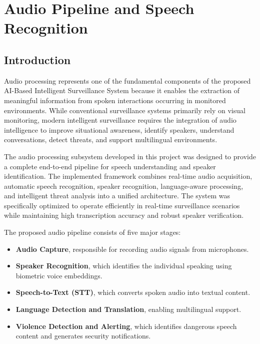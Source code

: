\documentclass[12pt]{report}
\begin{document}
\chapter{Audio Pipeline and Speech Recognition}
\setcounter{section}{0}

\section{Introduction}

Audio processing represents one of the fundamental components of the proposed AI-Based Intelligent Surveillance System because it enables the extraction of meaningful information from spoken interactions occurring in monitored environments. While conventional surveillance systems primarily rely on visual monitoring, modern intelligent surveillance requires the integration of audio intelligence to improve situational awareness, identify speakers, understand conversations, detect threats, and support multilingual environments.

The audio processing subsystem developed in this project was designed to provide a complete end-to-end pipeline for speech understanding and speaker identification. The implemented framework combines real-time audio acquisition, automatic speech recognition, speaker recognition, language-aware processing, and intelligent threat analysis into a unified architecture. The system was specifically optimized to operate efficiently in real-time surveillance scenarios while maintaining high transcription accuracy and robust speaker verification.

The proposed audio pipeline consists of five major stages:
\begin{itemize}
    \item \textbf{Audio Capture}, responsible for recording audio signals from microphones.
    \item \textbf{Speaker Recognition}, which identifies the individual speaking using biometric voice embeddings.
    \item \textbf{Speech-to-Text (STT)}, which converts spoken audio into textual content.
    \item \textbf{Language Detection and Translation}, enabling multilingual support.
    \item \textbf{Violence Detection and Alerting}, which identifies dangerous speech content and generates security notifications.
\end{itemize}
\end{document}
